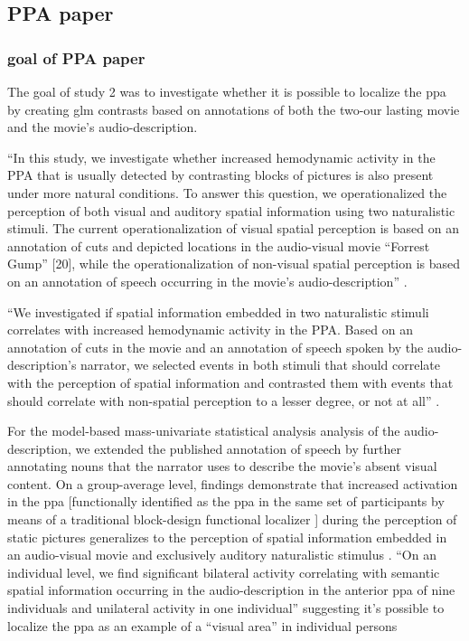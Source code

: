 \subsection{PPA paper}

\subsubsection{goal of PPA paper}





The goal of study 2 was to investigate whether it is possible to localize the
\ac{ppa} by creating \ac{glm} contrasts based on annotations of both the two-our
lasting movie and the movie's audio-description.

``In this study, we investigate whether increased hemodynamic activity in the
PPA that is usually detected by contrasting blocks of pictures is also present
under more natural conditions.
%
To answer this question, we operationalized the perception of both visual and
auditory spatial information using two naturalistic stimuli.
%
The current operationalization of visual spatial perception is based on an
annotation of cuts and depicted locations in the audio-visual movie ``Forrest
Gump'' [20], while the operationalization of non-visual spatial perception is
based on an annotation of speech occurring in the movie’s audio-description''
\citep{haeusler2022processing}.

``We investigated if spatial information embedded in two naturalistic stimuli
correlates with increased hemodynamic activity in the PPA.
%
Based on an annotation of cuts in the movie and an annotation of speech spoken
by the audio-description's narrator, we selected events in both stimuli that
should correlate with the perception of spatial information and contrasted them
with events that should correlate with non-spatial perception to a lesser
degree, or not at all'' \citep{haeusler2022processing}.


For the model-based mass-univariate statistical analysis analysis of the
audio-description, we extended the published annotation of speech
\citep{haeusler2021speechanno} by further annotating nouns that the narrator uses
to describe the movie's absent visual content.
On a group-average level, findings demonstrate that increased activation in the
\ac{ppa} [functionally identified as the \ac{ppa} in the same set of
participants by means of a traditional block-design functional localizer
\citep{sengupta2016extension}] during the perception of static pictures
generalizes to the perception of spatial information embedded in an audio-visual
movie and exclusively auditory naturalistic stimulus
\citep{haeusler2022processing}.
``On an individual level, we find significant bilateral activity correlating
with semantic spatial information occurring in the audio-description in the
anterior \ac{ppa} of nine individuals and unilateral activity in one
individual'' \citep{haeusler2022processing} suggesting it's possible to localize
the \ac{ppa} as an example of a ``visual area'' in individual persons


